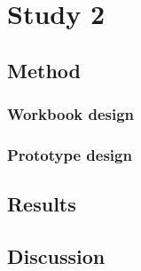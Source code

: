 \section{Study 2}

\subsection{Method}

\subsubsection{Workbook design}
\subsubsection{Prototype design}

\subsection{Results}

\subsection{Discussion}